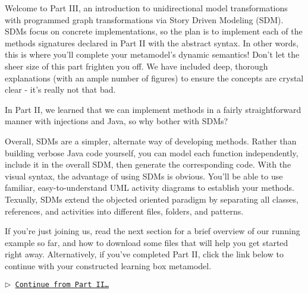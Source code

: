\genHeader
{}

Welcome to Part III, an introduction to unidirectional model transformations with programmed graph transformations via Story Driven Modeling (SDM).
SDMs focus on concrete implementations, so the plan is to implement each of the methods signatures declared in Part II with the abstract syntax. In other words,
this is where you'll complete your metamodel's dynamic semantics! Don't let the sheer size of this part frighten you off. We have included deep, thorough
explanations (with an ample number of figures) to ensure the concepts are crystal clear - it's really not that bad.

In Part II, we learned that we can implement methods in a fairly straightforward manner with injections and Java, so why bother with SDMs?

Overall, SDMs are a simpler, alternate way of developing methods. Rather than building verbose Java code yourself, you can model each function independently,
include it in the overall SDM, then generate the corresponding code. With the visual syntax, the advantage of using SDMs is obvious. You'll be able to use
familiar, easy-to-understand UML activity diagrams to establish your methods. Texually, SDMs extend the objected oriented paradigm by separating all classes,
references, and activities into different files, folders, and patterns.

If you're just joining us, read the next section for a brief overview of our running example so far, and how to download some files that will help you get
started right away. Alternatively, if you've completed Part II, click the link below to continue with your constructed learning box metamodel.

\begin{center}\texttt{$\triangleright$ \hyperlink{explanation}{Continue from Part II\ldots}}\end{center}
